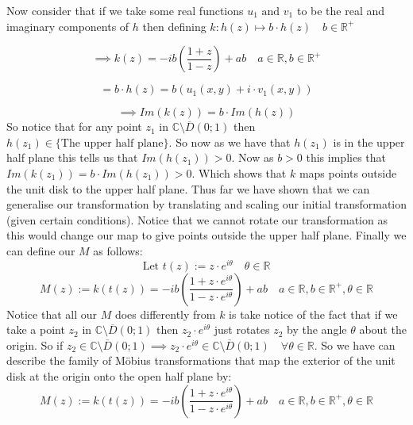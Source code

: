 \documentclass[12pt]{article}
\begin{document}
\noindent Now consider that if we take some real functions \(u_1 \text{ and } v_1\) to be the real and imaginary components of \(h\) then defining \(k : h(z) \mapsto b \cdot h(z) \quad b \in \mathbb{R}^{+}\)

\[
\implies k(z) = -ib\left(\frac{1+z}{1-z}\right) + ab \quad a \in \mathbb{R}, b \in \mathbb{R}^{+}
\]

\[
= b\cdot h(z) = b\left(u_1(x,y) + i\cdot v_1(x,y)\right)
\]

\[
\implies Im(k(z)) = b\cdot Im(h(z))
\]
\noindent So notice that for any point \(z_1\) in \(\mathbb{C}\setminus \overline{D}(0;1)\) then \(h(z_1) \in \{\text{The upper half plane}\}\). \newline
\linebreak
\noindent So now as we have that \(h(z_1)\) is in the upper half plane this tells us that \(Im(h(z_1))>0\). Now as \(b>0\) this implies that \(Im(k(z_1)) = b\cdot Im(h(z_1)) > 0\).\newline
\linebreak
\noindent Which shows that \(k\) maps points outside the unit disk to the upper half plane. \newline
\linebreak
\noindent Thus far we have shown that we can generalise our transformation by translating and scaling our initial transformation (given certain conditions). \newline
\linebreak
\noindent Notice that we cannot rotate our transformation as this would change our map to give points outside the upper half plane.\newline
\linebreak
\noindent Finally we can define our \(M\) as follows:
\[
\text{Let } t(z) := z\cdot e^{i\theta} \quad \theta \in \mathbb{R}
\] 
\[
M(z) := k(t(z)) = -ib\left(\frac{1+z\cdot e^{i\theta}}{1-z\cdot e^{i\theta}}\right) + ab \quad a \in \mathbb{R}, b \in \mathbb{R}^{+}, \theta \in \mathbb{R}
\]
\noindent Notice that all our \(M\) does differently from \(k\) is take notice of the fact that if we take a point \(z_2\) in \(\mathbb{C}\setminus \overline{D}(0;1)\) then \(z_2 \cdot e^{i\theta}\) just rotates \(z_2 \) by the angle \(\theta\) about the origin. So if \( z_2 \in \mathbb{C}\setminus \overline{D}(0;1) \implies z_2 \cdot e^{i\theta}\in \mathbb{C}\setminus \overline{D}(0;1)\quad  \forall \theta \in \mathbb{R}\).\newline
\linebreak
\noindent So we have can describe the family of M\"obius transformations that map the exterior of the unit disk at the origin onto the open half plane by:
\[
M(z) := k(t(z)) = -ib\left(\frac{1+z\cdot e^{i\theta}}{1-z\cdot e^{i\theta}}\right) + ab \quad a \in \mathbb{R}, b \in \mathbb{R}^{+}, \theta \in \mathbb{R}
\]
\end{document}
